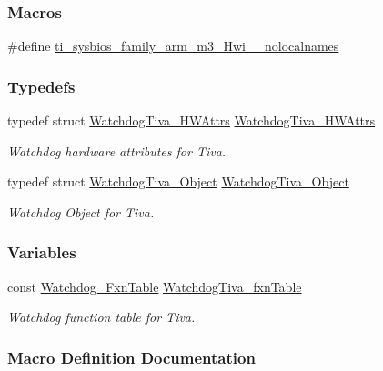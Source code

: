 \subsubsection*{Macros}
\begin{DoxyCompactItemize}
\item 
\#define \hyperlink{_watchdog_tiva_8h_aaa17ecf48f5762e2e1bdb0bab8aacf0c}{ti\+\_\+sysbios\+\_\+family\+\_\+arm\+\_\+m3\+\_\+\+Hwi\+\_\+\+\_\+nolocalnames}
\end{DoxyCompactItemize}
\subsubsection*{Typedefs}
\begin{DoxyCompactItemize}
\item 
typedef struct \hyperlink{struct_watchdog_tiva___h_w_attrs}{Watchdog\+Tiva\+\_\+\+H\+W\+Attrs} \hyperlink{_watchdog_tiva_8h_a7f1c7128705fb9a8435812e14f103fc1}{Watchdog\+Tiva\+\_\+\+H\+W\+Attrs}
\begin{DoxyCompactList}\small\item\em Watchdog hardware attributes for Tiva. \end{DoxyCompactList}\item 
typedef struct \hyperlink{struct_watchdog_tiva___object}{Watchdog\+Tiva\+\_\+\+Object} \hyperlink{_watchdog_tiva_8h_a59414cac1ebd2580c3475ac6d7f24342}{Watchdog\+Tiva\+\_\+\+Object}
\begin{DoxyCompactList}\small\item\em Watchdog Object for Tiva. \end{DoxyCompactList}\end{DoxyCompactItemize}
\subsubsection*{Variables}
\begin{DoxyCompactItemize}
\item 
const \hyperlink{struct_watchdog___fxn_table}{Watchdog\+\_\+\+Fxn\+Table} \hyperlink{_watchdog_tiva_8h_ae03e6ed51cc78abdf88691959865c2e2}{Watchdog\+Tiva\+\_\+fxn\+Table}
\begin{DoxyCompactList}\small\item\em Watchdog function table for Tiva. \end{DoxyCompactList}\end{DoxyCompactItemize}


\subsubsection{Macro Definition Documentation}
